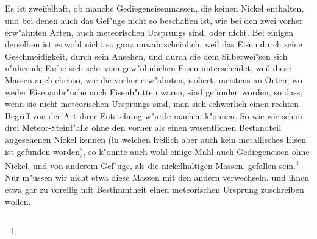 \documentclass[a4paper, 11pt, oneside, polutonikogreek, german]{article}
\begin{document}
\subsection{}
\paragraph{}
Es ist zweifelhaft, ob manche Gediegeneisenmassen, die keinen Nickel enthalten, und bei denen auch das Gef"uge nicht so beschaffen ist, wie bei den zwei vorher erw"ahnten Arten, auch meteorischen Ursprungs sind, oder nicht. Bei einigen derselben ist es wohl nicht so ganz unwahrscheinlich, weil das Eisen durch seine Geschmeidigkeit, durch sein Ansehen, und durch die dem Silberwei"sen sich n"ahernde Farbe sich sehr vom gew"ohnlichen Eisen unterscheidet, weil diese Massen auch ebenso, wie die vorher erw"ahnten, isoliert, meistens an Orten, wo weder Eisenanbr"uche noch Eisenh"utten waren, sind gefunden worden, so dass, wenn sie nicht meteorischen Ursprungs sind, man sich schwerlich einen rechten Begriff von der Art ihrer Entstehung w"urde machen k"onnen. So wie wir schon drei Meteor-Steinf"alle ohne den vorher als einen wesentlichen Bestandteil angesehenen Nickel kennen (in welchen freilich aber auch kein metallisches Eisen ist gefunden worden), so k"onnte auch wohl einige Mahl auch Gediegeneisen ohne Nickel, und von anderem Gef"uge, als die nickelhaltigen Massen, gefallen sein.\footnote{} Nur m"ussen wir nicht etwa diese Massen mit den andern verwechseln, und ihnen etwa gar zu voreilig mit Bestimmtheit einen meteorischen Ursprung zuschreiben wollen.
\end{document}

